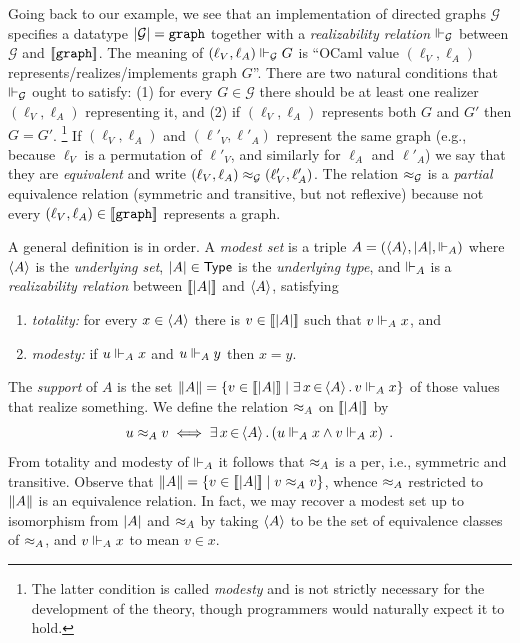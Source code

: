 Going back to our example, we see that an implementation of 
directed graphs $\mathcal{G}$ specifies a datatype
$|\mathcal{G}| = \mathtt{graph}$ together with a
\emph{realizability relation} $\Vdash_{\mathcal{G}}$ between
$\mathcal{G}$ and $[\![\mathtt{graph}]\!]$. The meaning of $(\ell_V,
\ell_A) \Vdash_\mathcal{G} G$ is ``OCaml value $(\ell_V, \ell_A)$ 
represents/realizes/implements graph $G$''. There are two natural conditions
that $\Vdash_\mathcal{G}$ ought to satisfy: (1) for every $G \in
\mathcal{G}$ there should be at least one realizer $(\ell_V, \ell_A)$
representing it, and (2) if $(\ell_V, \ell_A)$ represents both $G$ and
$G'$ then $G = G'$.%
\iflong
\footnote{The latter condition is called \emph{modesty} and
is not strictly necessary for the development of the theory, though 
programmers would naturally expect it to hold.}
\fi %
If
$(\ell_V, \ell_A)$ and $(\ell'_V, \ell'_A)$ represent the same graph 
(e.g., because $\ell_V$ is a permutation of $\ell'_V$, and similarly for $\ell_A$ and $\ell'_A$)
we say that they are \emph{equivalent} and write $(\ell_V, \ell_A)
\approx_\mathcal{G} (\ell'_V, \ell'_A)$. The relation $\approx_\mathcal{G}$
is a \emph{partial} equivalence relation (symmetric and transitive,
but not reflexive) because not every $(\ell_V, \ell_A) \in
[\![\mathtt{graph}]\!]$ represents a graph.

\smallskip

A general definition is in order. A \emph{modest set} is a triple $A =
(\langle A \rangle, |A|, {\Vdash_A})$ where $\langle A \rangle$ is the
\emph{underlying set}, $|A| \in \mathsf{Type}$ is the \emph{underlying
  type}, and $\Vdash_A$ is a \emph{realizability relation} between
$[\![|A|]\!]$ and $\langle A \rangle$, satisfying
% 
\begin{enumerate}
\item \emph{totality:} for every $x \in \langle A \rangle$ there is $v \in
  [\![|A|]\!]$ such that $v \Vdash_A x$, and
\item \emph{modesty:} if $u \Vdash_A x$ and $u \Vdash_A y$ then $x = y$.
\end{enumerate}
%
The \emph{support} of $A$ is the set $\|A\| = \{v \in
  [\![|A|]\!] \mid \exists\, x \,{\in}\, \langle A \rangle\,.\,v \Vdash_A x\}$ of those
values that realize something. We define the relation $\approx_A$ on
$[\![|A|]\!]$ by
%
\begin{equation*}
  u \approx_A v
  \iff
  \exists\, x \,{\in}\, \langle A \rangle\,.\left(u \Vdash_A x \land v \Vdash_A x\right) \;.
\end{equation*}
%
From totality and modesty of $\Vdash_A$ it follows that $\approx_A$ is a per,
i.e., symmetric and transitive. Observe that $\|A\| = \{v \in
  [\![|A|]\!] \mid v \approx_A v\}$, whence $\approx_A$
restricted to $\|A\|$ is an equivalence relation. In fact, we
may recover a modest set up to isomorphism from $|A|$ and
$\approx_A$ by taking $\langle A \rangle$ to be the set of equivalence classes of
$\approx_A$, and $v \Vdash_A x$ to mean $v \in x$.

